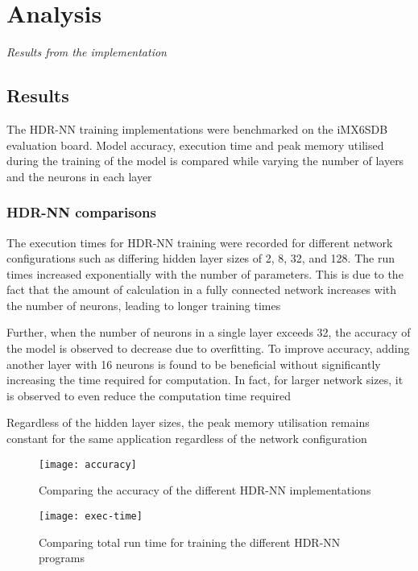 \part{Analysis}
\textit{Results from the implementation}

\chapter{Results}

The HDR-NN training implementations were benchmarked on the iMX6SDB evaluation board. Model accuracy, execution time and peak memory utilised during the training of the model is compared while varying the number of layers and the neurons in each layer

\section{HDR-NN comparisons}

The execution times for HDR-NN training were recorded for different network configurations such as differing hidden layer sizes of 2, 8, 32, and 128. The run times increased exponentially with the number of parameters. This is due to the fact that the amount of calculation in a fully connected network increases with the number of neurons, leading to longer training times

Further, when the number of neurons in a single layer exceeds 32, the accuracy of the model is observed to decrease due to overfitting. To improve accuracy, adding another layer with 16 neurons is found to be beneficial without significantly increasing the time required for computation. In fact, for larger network sizes, it is observed to even reduce the computation time required

Regardless of the hidden layer sizes, the peak memory utilisation remains constant for the same application regardless of the network configuration

\begin{figure}[ht]
	\centering
	\texttt{[image: accuracy]}
	\caption[HDR-NN Accuracy]{Comparing the accuracy of the different HDR-NN implementations}
\end{figure}

\begin{figure}[ht]
	\centering
	\texttt{[image: exec-time]}
	\caption[Execution Time vs Model Parameters]{Comparing total run time for training the different HDR-NN programs}
\end{figure}

